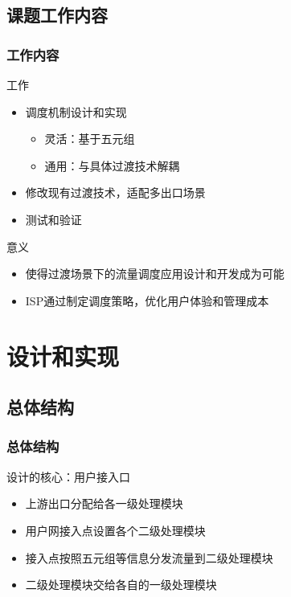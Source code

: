\documentclass{beamer}
\begin{document}
\subsection{课题工作内容}
\begin{frame}
  \frametitle{工作内容}

  \begin{block}{工作}
    \begin{itemize}
    \item 调度机制设计和实现
      \begin{itemize}
      \item 灵活：基于五元组
      \item 通用：与具体过渡技术解耦
      \end{itemize}
    \item 修改现有过渡技术，适配多出口场景
    \item 测试和验证
    \end{itemize}
  \end{block}

  \begin{block}{意义}
    \begin{itemize}
    \item 使得过渡场景下的流量调度应用设计和开发成为可能
    \item ISP通过制定调度策略，优化用户体验和管理成本
    \end{itemize}
  \end{block}
\end{frame}

\section{设计和实现}
\subsection{总体结构}
\begin{frame}
  \frametitle{总体结构}

  \begin{block}{设计的核心：用户接入口}
    \begin{itemize}
    \item 上游出口分配给各一级处理模块
    \item 用户网接入点设置各个二级处理模块
    \item 接入点按照五元组等信息分发流量到二级处理模块
    \item 二级处理模块交给各自的一级处理模块
    \end{itemize}
  \end{block}
\end{frame}
\end{document}
